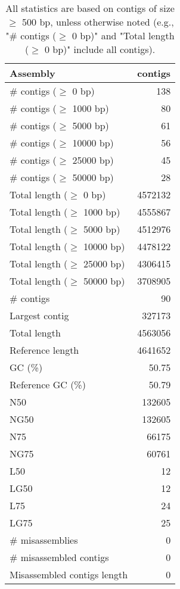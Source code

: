 \documentclass[12pt,a4paper]{article}
\begin{document}
\begin{table}[ht]
\begin{center}
\caption{All statistics are based on contigs of size $\geq$ 500 bp, unless otherwise noted (e.g., "\# contigs ($\geq$ 0 bp)" and "Total length ($\geq$ 0 bp)" include all contigs).}
\begin{tabular}{|l*{1}{|r}|}
\hline
Assembly & contigs \\ \hline
\# contigs ($\geq$ 0 bp) & 138 \\ \hline
\# contigs ($\geq$ 1000 bp) & 80 \\ \hline
\# contigs ($\geq$ 5000 bp) & 61 \\ \hline
\# contigs ($\geq$ 10000 bp) & 56 \\ \hline
\# contigs ($\geq$ 25000 bp) & 45 \\ \hline
\# contigs ($\geq$ 50000 bp) & 28 \\ \hline
Total length ($\geq$ 0 bp) & 4572132 \\ \hline
Total length ($\geq$ 1000 bp) & 4555867 \\ \hline
Total length ($\geq$ 5000 bp) & 4512976 \\ \hline
Total length ($\geq$ 10000 bp) & 4478122 \\ \hline
Total length ($\geq$ 25000 bp) & 4306415 \\ \hline
Total length ($\geq$ 50000 bp) & 3708905 \\ \hline
\# contigs & 90 \\ \hline
Largest contig & 327173 \\ \hline
Total length & 4563056 \\ \hline
Reference length & 4641652 \\ \hline
GC (\%) & 50.75 \\ \hline
Reference GC (\%) & 50.79 \\ \hline
N50 & 132605 \\ \hline
NG50 & 132605 \\ \hline
N75 & 66175 \\ \hline
NG75 & 60761 \\ \hline
L50 & 12 \\ \hline
LG50 & 12 \\ \hline
L75 & 24 \\ \hline
LG75 & 25 \\ \hline
\# misassemblies & 0 \\ \hline
\# misassembled contigs & 0 \\ \hline
Misassembled contigs length & 0 \\ \hline

\end{tabular}
\end{center}
\end{table}
\end{document}
